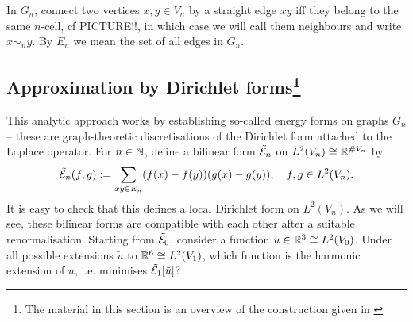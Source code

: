 In $G_n$, connect two vertices $x,y\in V_n$ by a straight edge $xy$ iff they belong to the same $n$-cell, cf PICTURE!!, in which case we will call them neighbours and write $x\sim_n y$. By $E_n$ we mean the set of all edges in $G_n$. 



\subsection[Approximation by Dirichlet forms]{Approximation by Dirichlet forms\protect\footnote{The material in this section is an overview of the construction given in \cite[chapter I]{strichartz2006differential}}}

This analytic approach works by establishing so-called energy forms on graphs $G_n$ -- these are graph-theoretic discretisations of the Dirichlet form attached to the Laplace operator. For $n\in\mathbb{N}$, define a bilinear form $\tilde{\mathcal{E}}_n$ on $L^2(V_n)\cong \mathbb{R}^{\# V_n}$ by 
\[
  \tilde{\mathcal{E}}_n(f,g):=\sum_{xy\in E_n}(f(x)-f(y))(g(x)-g(y)), 
  \ \ \ f,g\in L^2(V_n).
\]
It is easy to check that this defines a local Dirichlet form on $L^2(V_n)$. As we will see, these bilinear forms are compatible with each other after a suitable renormalisation. Starting from $\tilde{\mathcal{E}}_0$, consider a function 
$u\in\mathbb{R}^3\cong L^2(V_0)$. Under all possible extensions 
$\tilde u$ to $\mathbb{R}^6\cong L^2(V_1)$, which function is the harmonic extension of $u$, i.e. minimises $\tilde{\mathcal{E}}_1[\tilde u]$? 

